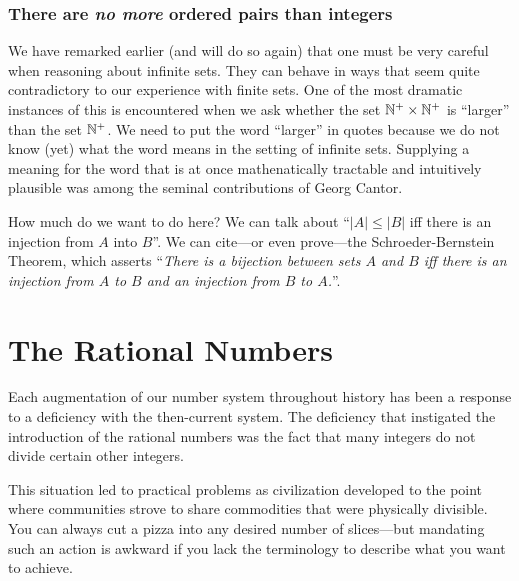 \subsubsection{There are {\em no more} ordered pairs than integers}
\label{sec:cardinality-NxN}

We have remarked earlier (and will do so again) that one must be very
careful when reasoning about infinite sets.  They can behave in ways
that seem quite contradictory to our experience with finite sets.  One
of the most dramatic instances of this is encountered when we ask
whether the set $\mathbb{N}^+ \times \mathbb{N}^+$ is ``larger'' than the set $\mathbb{N}^+$.
We need to put the word ``larger'' in quotes because we do not know
(yet) what the word means in the setting of infinite sets.  Supplying
a meaning for the word that is at once mathenatically tractable and
intuitively plausible was among the seminal contributions of Georg
Cantor. 

{\Arny How much do we want to do here?  We can talk about ``$|A| \leq
  |B|$ iff there is an injection from $A$ into $B$''.  We can
  cite---or even prove---the Schroeder-Bernstein Theorem, which
  asserts ``{\em There is a {\em bijection} between sets $A$ and $B$
    iff there is an {\em injection} from $A$ to $B$ and an injection
    from $B$ to $A$.}''.}

\cite{Cantor74,Cantor78}



\section{The Rational Numbers}
\label{sec:rationals}


Each augmentation of our number system throughout history has been a
response to a deficiency with the then-current system.  The deficiency
that instigated the introduction of the rational numbers was the fact
that many integers do not divide certain other integers.

This situation led to practical problems as civilization developed to
the point where communities strove to share commodities that were
physically divisible.  You can always cut a pizza into any desired
number of slices---but mandating such an action is awkward if you lack
the terminology to describe what you want to achieve.

